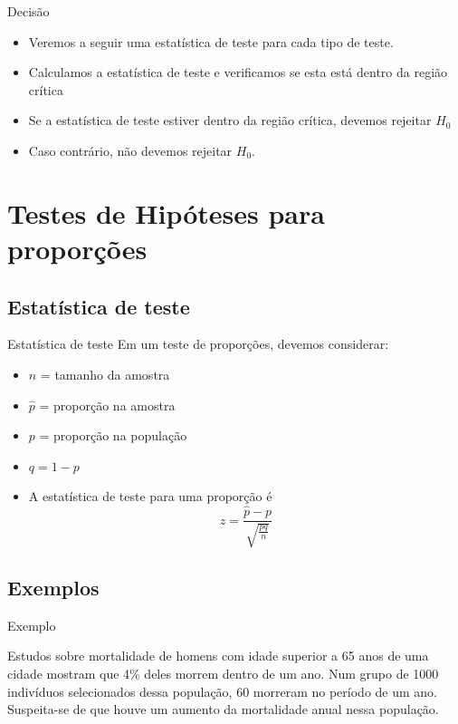 \documentclass{beamer}
\begin{document}
\begin{frame}{Decisão}
  \begin{itemize}
  \item Veremos a seguir uma estatística de teste para cada tipo de teste.
  \item Calculamos a estatística de teste e verificamos se esta está
    dentro da região crítica
  \item Se a estatística de teste estiver dentro da região crítica,
    devemos rejeitar $H_0$
  \item Caso contrário, não devemos rejeitar $H_0$.
  \end{itemize}
\end{frame}

\section{Testes de Hipóteses para proporções}

\subsection{Estatística de teste}

\begin{frame}{Estatística de teste}
  Em um teste de proporções, devemos considerar:
  \begin{itemize}
  \item $n$ = tamanho da amostra
  \item $\hat{p}$ = proporção na amostra
  \item $p$ = proporção na população
  \item $q=1-p$
  \item A estatística de teste para uma proporção é
    \begin{displaymath}
      z = \frac{\hat{p} - p}{\sqrt{\frac{pq}{n}}}
    \end{displaymath}
  \end{itemize}
\end{frame}

\subsection{Exemplos}

\begin{frame}{Exemplo}
  \begin{example}
    Estudos sobre mortalidade de homens com idade superior a 65 anos
    de uma cidade mostram que 4\% deles morrem dentro de um ano. Num
    grupo de 1000 indivíduos selecionados dessa população, 60 morreram
    no período de um ano. Suspeita-se de que houve um aumento da
    mortalidade anual nessa população.
  \end{example}
\end{frame}
\end{document}
